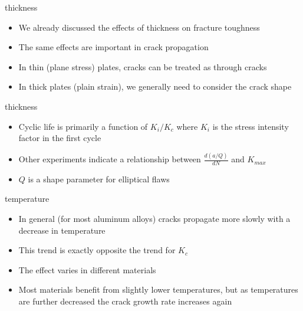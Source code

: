 \documentclass[10pt]{beamer}
\begin{document}
\begin{frame}{thickness}
	\begin{itemize}[<+->]
		\item We already discussed the effects of thickness on fracture toughness
		\item The same effects are important in crack propagation
		\item In thin (plane stress) plates, cracks can be treated as through cracks
		\item In thick plates (plain strain), we generally need to consider the crack shape
	\end{itemize}
\end{frame}

\begin{frame}{thickness}
	\begin{itemize}[<+->]
		\item Cyclic life is primarily a function of $K_i / K_c$ where $K_i$ is the stress intensity factor in the first cycle
		\item Other experiments indicate a relationship between $\frac{d(a/Q)}{dN}$ and $K_{max}$
		\item $Q$ is a shape parameter for elliptical flaws
	\end{itemize}
\end{frame}

\begin{frame}{temperature}
	\begin{itemize}[<+->]
		\item In general (for most aluminum alloys) cracks propagate more slowly with a decrease in temperature
		\item This trend is exactly opposite the trend for $K_c$
		\item The effect varies in different materials
		\item Most materials benefit from slightly lower temperatures, but as temperatures are further decreased the crack growth rate increases again
	\end{itemize}
\end{frame}
\end{document}
